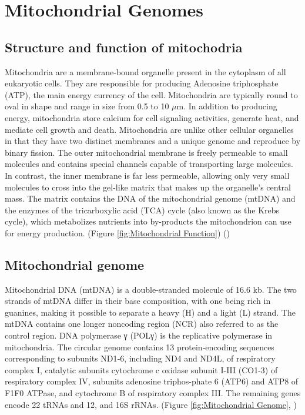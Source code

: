 \section{Mitochondrial Genomes}
\subsection{Structure and function of mitochodria}
Mitochondria are a membrane-bound organelle present in the cytoplasm of all eukaryotic cells. They are responsible for producing Adenosine triphosphate (ATP), the main energy currency of the cell.
Mitochondria are typically round to oval in shape and range in
size from 0.5 to 10 $\mu$m. In addition to producing energy,
mitochondria store calcium for cell signaling activities, generate
heat, and mediate cell growth and death.
Mitochondria are unlike other cellular organelles in that they
have two distinct membranes and a unique genome and reproduce by
binary fission. 
The outer mitochondrial membrane is freely permeable to small
molecules and contains special channels capable of transporting
large molecules. 
In contrast, the inner membrane is far less permeable, allowing
only very small molecules to cross into the gel-like matrix that
makes up the organelle’s central mass. 
The matrix contains the DNA of the mitochondrial genome (mtDNA)
and the enzymes of the tricarboxylic acid (TCA) cycle (also known
as the Krebs cycle), which metabolizes nutrients into by-products
the mitochondrion can use for energy production. (Figure
\ref{fig:Mitochondrial Function}) (\cite{friedman2014mitochondrial})


\subsection{Mitochondrial genome}
Mitochondrial DNA (mtDNA) is a double-stranded molecule of 16.6
kb. The two strands of mtDNA differ in their base composition,
with one being rich in guanines, making it possible to separate a
heavy (H) and a light (L) strand. The mtDNA contains one longer
noncoding region (NCR) also referred to as the control region. DNA
polymerase γ (POLγ) is the replicative polymerase in
mitochondria. 
The circular genome contains 13 protein‐encoding sequences
corresponding to subunits ND1‐6, including ND4 and ND4L, of
respiratory complex I, catalytic subunits cytochrome c oxidase
subunit I-III (CO1-3) of respiratory complex IV, subunits
adenosine triphos-phate 6 (ATP6) and ATP8 of F1F0 ATPase, and
cytochrome B of respiratory complex III. 
The remaining genes encode 22 tRNAs and 12, and 16S rRNAs. (Figure \ref{fig:Mitochondrial Genome}, \cite{stefano2016mitochondrial, garone2018mitochondrial})\\

